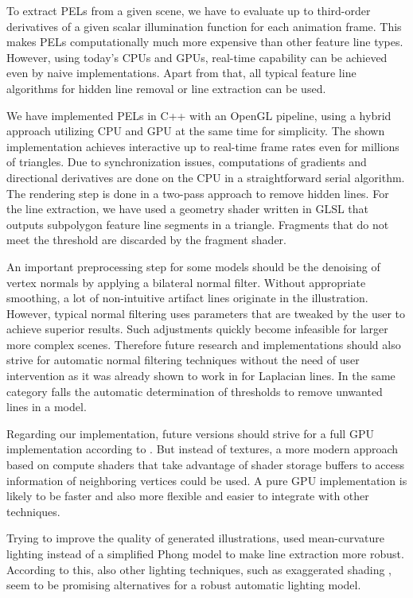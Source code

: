 \documentclass[9pt,fleqn,twoside,twocolumn]{stdglobal}
\begin{document}
  To extract PELs from a given scene, we have to evaluate up to third-order derivatives of a given scalar illumination function for each animation frame.
  This makes PELs computationally much more expensive than other feature line types.
  However, using today's CPUs and GPUs, real-time capability can be achieved even by naive implementations.
  Apart from that, all typical feature line algorithms for hidden line removal or line extraction can be used.

  We have implemented PELs in C++ with an OpenGL pipeline, using a hybrid approach utilizing CPU and GPU at the same time for simplicity.
  The shown implementation achieves interactive up to real-time frame rates even for millions of triangles.
  Due to synchronization issues, computations of gradients and directional derivatives are done on the CPU in a straightforward serial algorithm.
  The rendering step is done in a two-pass approach to remove hidden lines.
  For the line extraction, we have used a geometry shader written in GLSL that outputs subpolygon feature line segments in a triangle.
  Fragments that do not meet the threshold are discarded by the fragment shader.

  An important preprocessing step for some models should be the denoising of vertex normals by applying a bilateral normal filter.
  Without appropriate smoothing, a lot of non-intuitive artifact lines originate in the illustration.
  However, typical normal filtering uses parameters that are tweaked by the user to achieve superior results.
  Such adjustments quickly become infeasible for larger more complex scenes.
  Therefore future research and implementations should also strive for automatic normal filtering techniques without the need of user intervention as it was already shown to work in \textcite{zhang2011} for Laplacian lines.
  In the same category falls the automatic determination of thresholds to remove unwanted lines in a model.

  Regarding our implementation, future versions should strive for a full GPU implementation according to \textcite{zhang2010}.
  But instead of textures, a more modern approach based on compute shaders that take advantage of shader storage buffers to access information of neighboring vertices could be used.
  A pure GPU implementation is likely to be faster and also more flexible and easier to integrate with other techniques.

  Trying to improve the quality of generated illustrations, \citeauthor{zhang2010} used mean-curvature lighting \autocite{kindlmann2003,kolomenkin2008} instead of a simplified Phong model to make line extraction more robust.
  According to this, also other lighting techniques, such as exaggerated shading \autocite{rusinkiewicz2006}, seem to be promising alternatives for a robust automatic lighting model.

\nocite{*}
\AtNextBibliography{\footnotesize}
\printbibliography[heading=bibintoc]

\appendix
\end{document}
